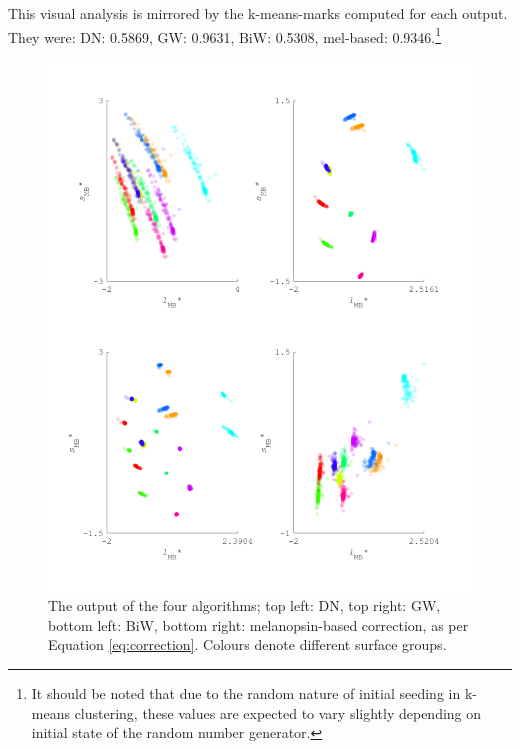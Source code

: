 This visual analysis is mirrored by the k-means-marks computed for each output. They were: \gls{DN}: 0.5869, \gls{GW}: 0.9631, \gls{BiW}: 0.5308, mel-based: 0.9346.\footnote{It should be noted that due to the random nature of initial seeding in k-means clustering, these values are expected to vary slightly depending on initial state of the random number generator.}

\begin{figure}[htbp]
\includegraphics[max width=1.2\textwidth, center]{figs/comp/comparisonFourAlgos/output100.pdf}
 \caption{The output of the four algorithms; top left: \gls{DN}, top right: \gls{GW}, bottom left: \gls{BiW}, bottom right: melanopsin-based correction, as per Equation \ref{eq:correction}. Colours denote different surface groups.}
 \label{fig:output100}
\end{figure} 

